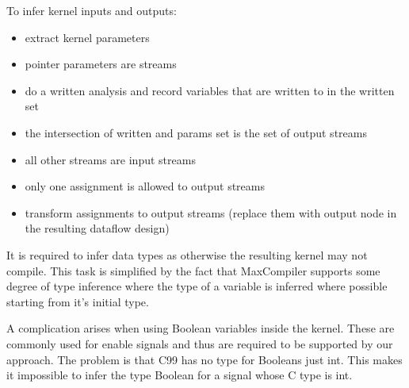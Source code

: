 To infer kernel inputs and outputs:
\begin{itemize}
\item extract kernel parameters
\item pointer parameters are streams
\item do a written analysis and record variables that are written to in the written set
\item the intersection of written and params set is the set of output streams
\item all other streams are input streams
\item only one assignment is allowed to output streams
\item transform assignments to output streams (replace them with output node in the resulting dataflow design)
\end{itemize}

It is required to infer data types as otherwise the resulting kernel
may not compile.  This task is simplified by the fact that MaxCompiler
supports some degree of type inference where the type of a variable is
inferred where possible starting from it's initial type.

A complication arises when using Boolean variables inside the
kernel. These are commonly used for enable signals and thus are
required to be supported by our approach. The problem is that C99 has
no type for Booleans just int. This makes it impossible to infer the
type Boolean for a signal whose C type is int.

